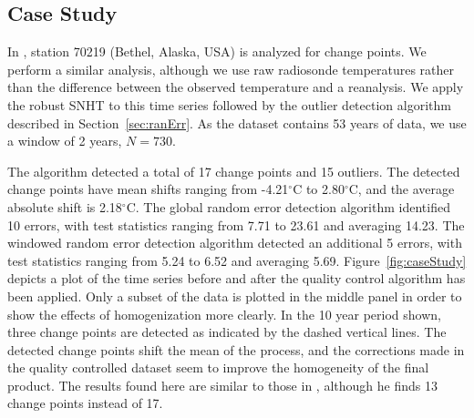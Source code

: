 \documentclass[12pt]{article}
\begin{document}
\begin{doublespacing}

\section{Case Study}

In \cite{haimberger07}, station 70219 (Bethel, Alaska, USA) is analyzed for change points.  We perform a similar analysis, although we use raw radiosonde temperatures rather than the difference between the observed temperature  and a reanalysis.  We apply the robust SNHT to this time series followed by the outlier detection algorithm described in Section~\ref{sec:ranErr}.  As the dataset contains 53 years of data, we use a window of 2 years, $N=730$.

The algorithm detected a total of 17 change points and 15 outliers.  The detected change points have mean shifts ranging from -4.21$^\circ$C to 2.80$^\circ$C, and the average absolute shift is 2.18$^\circ$C. The global random error detection algorithm identified 10 errors, with test statistics ranging from 7.71 to 23.61 and averaging 14.23.  The windowed random error detection algorithm detected an additional 5 errors, with test statistics ranging from 5.24 to 6.52 and averaging 5.69. Figure~\ref{fig:caseStudy} depicts a plot of the time series before and after the quality control algorithm has been applied.  Only a subset of the data is plotted in the middle panel in order to show the effects of homogenization more clearly.  In the 10 year period shown, three change points are detected as indicated by the dashed vertical lines.  The detected change points shift the mean of the process, and the corrections made in the quality controlled dataset seem to improve the homogeneity of the final product. The results found here are similar to those in \cite{haimberger07}, although he finds 13 change points instead of 17.


\end{doublespacing}
\end{document}
